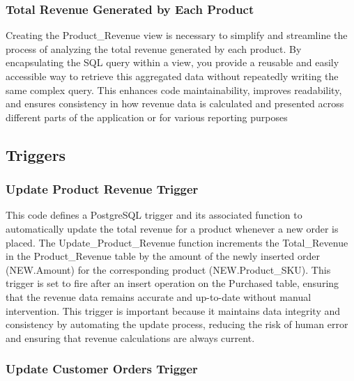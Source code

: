 \subsubsection{Total Revenue Generated by Each Product}



Creating the Product\_Revenue view is necessary to simplify and streamline the process of analyzing the total revenue generated by each product. By encapsulating the SQL query within a view, you provide a reusable and easily accessible way to retrieve this aggregated data without repeatedly writing the same complex query. This enhances code maintainability, improves readability, and ensures consistency in how revenue data is calculated and presented across different parts of the application or for various reporting purposes

\subsection{Triggers}

\subsubsection{Update Product Revenue Trigger}



This code defines a PostgreSQL trigger and its associated function to automatically update the total revenue for a product whenever a new order is placed. The Update\_Product\_Revenue function increments the Total\_Revenue in the Product\_Revenue table by the amount of the newly inserted order (NEW.Amount) for the corresponding product (NEW.Product\_SKU). This trigger is set to fire after an insert operation on the Purchased table, ensuring that the revenue data remains accurate and up-to-date without manual intervention. This trigger is important because it maintains data integrity and consistency by automating the update process, reducing the risk of human error and ensuring that revenue calculations are always current.

\subsubsection{Update Customer Orders Trigger}

